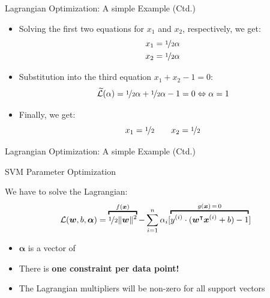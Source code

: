 \begin{frame}{Lagrangian Optimization: A simple Example (Ctd.)}{}
	\begin{itemize}
		\item Solving the first two equations for $x_1$ and $x_2$, respectively, we get:
		\begin{align}
			x_1 &= \nicefrac{1}{2} \alpha \\
			x_2 &= \nicefrac{1}{2} \alpha
		\end{align}
		\item Substitution into the third equation $x_1 + x_2 - 1 = 0$:
		\begin{equation}
			\widetilde{\mathcal{L}}(\alpha) =
				\nicefrac{1}{2} \alpha + \nicefrac{1}{2} \alpha - 1 = 0 \Leftrightarrow \alpha = 1
		\end{equation}
		\item Finally, we get:
		\begin{equation*}
			x_1 = \nicefrac{1}{2} \qquad x_2 = \nicefrac{1}{2}
		\end{equation*}
	\end{itemize}
\end{frame}


\begin{frame}{Lagrangian Optimization: A simple Example (Ctd.)}{}
	
\end{frame}


\begin{frame}{SVM Parameter Optimization}{}
	\begin{boxBlueNoFrame}
		We have to solve the Lagrangian:
		\begin{equation}
			\mathcal{L}(\bm{w}, b, \bm{\alpha}) = \overbracket{
				\nicefrac{1}{2} \Vert \bm{w} \Vert^2
			}^{f(\bm{x})} -
			\sum_{i=1}^n \alpha_i [\overbracket{
				y^{(i)} \cdot (\bm{w}^{\intercal} \bm{x}^{(i)} + b) - 1
			}^{g(\bm{x})\, =\, 0}]
		\end{equation}
	\end{boxBlueNoFrame}
	\begin{itemize}
		\item $\bm{\alpha}$ is a vector of 
		\item There is \textbf{one constraint per data point!}
		\item The Lagrangian multipliers will be non-zero for all support vectors
	\end{itemize}
\end{frame}


